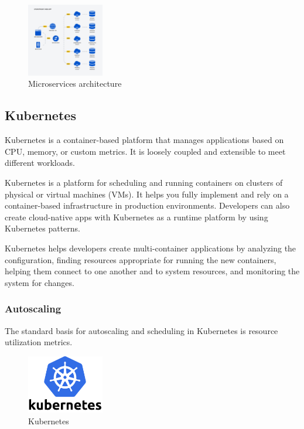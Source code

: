 \documentclass[conference]{IEEEtran}
\begin{document}
\begin{figure}[!h]
    \begin{center}
        \includegraphics[width=0.3\textwidth]{figures/microservice.png}
    \end{center}
    \caption{Microservices architecture}
    \label{fig:2}
\end{figure}


\subsection{Kubernetes}

Kubernetes is a container-based platform that manages applications based on CPU, memory, or custom metrics. It is loosely coupled and extensible to meet different workloads.

Kubernetes is a platform for scheduling and running containers on clusters of physical or virtual machines (VMs). It helps you fully implement and rely on a container-based infrastructure in production environments. Developers can also create cloud-native apps with Kubernetes as a runtime platform by using Kubernetes patterns.

Kubernetes helps developers create multi-container applications by analyzing the configuration, finding resources appropriate for running the new containers, helping them connect to one another and to system resources, and monitoring the system for changes.


\subsubsection{Autoscaling}
The standard basis for autoscaling and scheduling in Kubernetes is resource utilization metrics.

\begin{figure}[!h]
    \begin{center}
        \includegraphics[width=0.3\textwidth]{figures/kubernetes.png}
    \end{center}
    \caption{Kubernetes}
    \label{fig:Kubernetes}
\end{figure}
\end{document}
